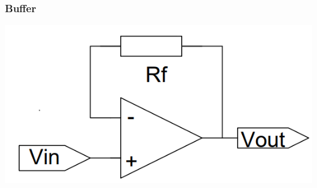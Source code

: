 \documentclass[margin=normal]{tex/hsrzf}
\begin{document}
\subsubsection*{Buffer}
\includegraphics{img/OpAmp/Buffer.png}
\end{document}
